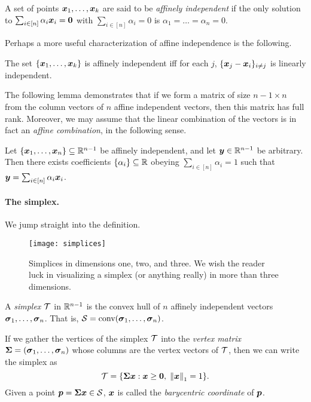 \begin{definition}
	\label{def:affine_independence}
A set of points $\vb*{x}_1,\dots,\vb*{x}_k$ are said to be \emph{affinely independent} if the only solution to $\sum_{i\in[n]}\alpha_i\vb*{x}_i=\vb{0}$ with $\sum_{i\in [n]}\alpha_i=0$ is $\alpha_1=\dots=\alpha_n=0$. 
\end{definition}

Perhaps a more useful characterization of affine independence is the following. 

\begin{lemma}
	\label{lem:affine-linearly-independent}
	The set $\{\vb*{x}_1,\dots,\vb*{x}_k\}$ is affinely independent iff for each $j$, $\{\vb*{x}_j-\vb*{x}_i\}_{i\neq j}$ is linearly independent. 
\end{lemma}

The following lemma demonstrates that if we form a matrix of size $n-1\times n$ from the column vectors of $n$  affine independent vectors, then this matrix has full rank. Moreover, we may assume that the linear combination of the vectors is in fact an \emph{affine combination}, in the  following sense. 

\begin{lemma}
	\label{lem:barycentric_coeffs}
	Let $\{\vb*{x}_1,\dots,\vb*{x}_n\}\subseteq\mathbb{R}^{n-1}$ be affinely independent, and let  $\vb*{y}\in\mathbb{R}^{n-1}$ be arbitrary. Then there exists coefficients $\{\alpha_i\}\subseteq\mathbb{R}$ obeying $\sum_{i\in[n]}\alpha_i=1$ such that $\vb*{y}=\sum_{i\in[n]}\alpha_i\vb*{x}_i$. 
\end{lemma}

\paragraph{The simplex.} 
We jump straight into the definition. 
\begin{figure}
	\centering
	\texttt{[image: simplices]}
	\caption{Simplices in dimensions one, two, and three. We wish the reader luck in visualizing a simplex (or anything really) in more than three dimensions.}
\end{figure}


\begin{definition}
\label{def:simplex}
A \emph{simplex} $\mathcal{T}$ in $\mathbb{R}^{n-1}$ is the convex hull of $n$ affinely independent vectors $\vb*{\sigma}_1,\dots,\vb*{\sigma}_n$. That is, $\mathcal{S}=\textnormal{conv}(\vb*{\sigma}_1,\dots,\vb*{\sigma}_n)$.  
\end{definition}

If we gather the vertices of the simplex $\mathcal{T}$ into the \emph{vertex matrix} $\boldsymbol{\Sigma}=(\vb*{\sigma}_1,\dots,\vb*{\sigma}_n)$ whose columns are the vertex vectors of $\mathcal{T}$, then we can write the simplex as 
\begin{equation*}
    \mathcal{T} = \{\boldsymbol{\Sigma} \vb*{x}:\vb*{x}\geq \vb{0}, \; \norm{\vb*{x}}_1=1\}.
\end{equation*}
Given a point $\vb*{p}=\boldsymbol{\Sigma}\vb*{x}\in\mathcal{S}$, $\vb*{x}$ is called the \emph{barycentric coordinate} of $\vb*{p}$.  

